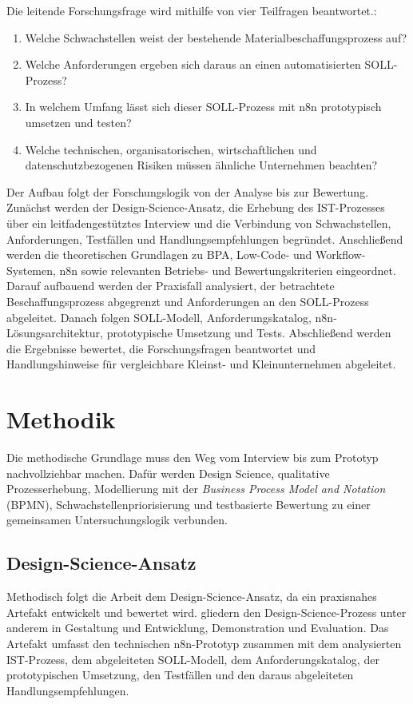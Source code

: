 \documentclass[a4paper,12pt]{article}
\begin{document}
Die leitende Forschungsfrage wird mithilfe von vier Teilfragen beantwortet.:

\begin{enumerate}
    \item Welche Schwachstellen weist der bestehende Materialbeschaffungsprozess auf?
    \item Welche Anforderungen ergeben sich daraus an einen automatisierten SOLL-Prozess?
    \item In welchem Umfang lässt sich dieser SOLL-Prozess mit n8n prototypisch umsetzen und testen?
    \item Welche technischen, organisatorischen, wirtschaftlichen und datenschutzbezogenen Risiken müssen ähnliche Unternehmen beachten?
\end{enumerate}

Der Aufbau folgt der Forschungslogik von der Analyse bis zur Bewertung. Zunächst werden der Design-Science-Ansatz, die Erhebung des IST-Prozesses über ein leitfadengestütztes Interview und die Verbindung von Schwachstellen, Anforderungen, Testfällen und Handlungsempfehlungen begründet. Anschließend werden die theoretischen Grundlagen zu BPA, Low-Code- und Workflow-Systemen, n8n sowie relevanten Betriebs- und Bewertungskriterien eingeordnet. Darauf aufbauend werden der Praxisfall analysiert, der betrachtete Beschaffungsprozess abgegrenzt und Anforderungen an den SOLL-Prozess abgeleitet. Danach folgen SOLL-Modell, Anforderungskatalog, n8n-Lösungsarchitektur, prototypische Umsetzung und Tests. Abschließend werden die Ergebnisse bewertet, die Forschungsfragen beantwortet und Handlungshinweise für vergleichbare Kleinst- und Kleinunternehmen abgeleitet.

\clearpage
\section{Methodik}
Die methodische Grundlage muss den Weg vom Interview bis zum Prototyp nachvollziehbar machen. Dafür werden Design Science, qualitative Prozesserhebung, Modellierung mit der \textit{Business Process Model and Notation} (BPMN), Schwachstellenpriorisierung und testbasierte Bewertung zu einer gemeinsamen Untersuchungslogik verbunden.

\subsection{Design-Science-Ansatz}
Methodisch folgt die Arbeit dem Design-Science-Ansatz, da ein praxisnahes Artefakt entwickelt und bewertet wird. \Textcite{peffers_design_2007} gliedern den Design-Science-Prozess unter anderem in Gestaltung und Entwicklung, Demonstration und Evaluation. Das Artefakt umfasst den technischen n8n-Prototyp zusammen mit dem analysierten IST-Prozess, dem abgeleiteten SOLL-Modell, dem Anforderungskatalog, der prototypischen Umsetzung, den Testfällen und den daraus abgeleiteten Handlungsempfehlungen.
\end{document}
